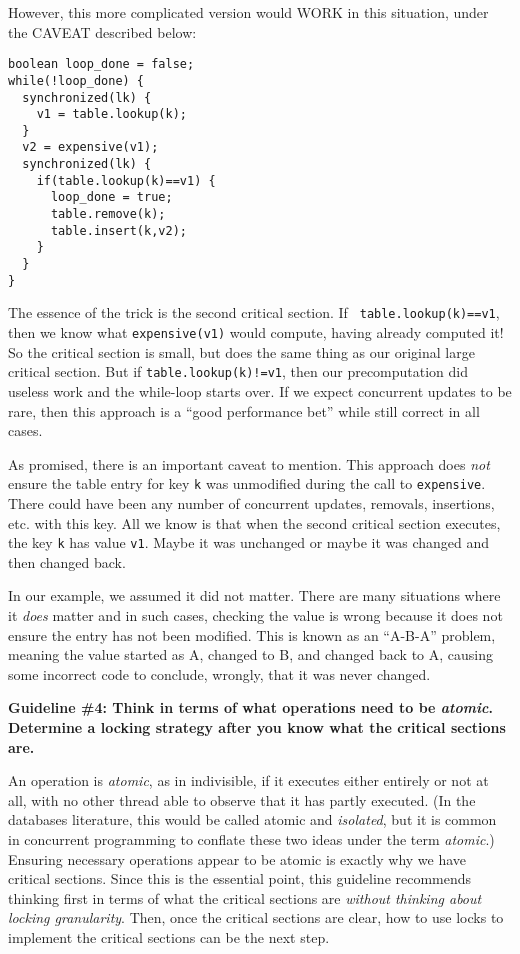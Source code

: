 \documentclass[10pt]{article}
\begin{document}
However, this more complicated version would WORK in this situation,
under the CAVEAT described below:
\begin{verbatim}
boolean loop_done = false;
while(!loop_done) {
  synchronized(lk) {
    v1 = table.lookup(k);
  } 
  v2 = expensive(v1);
  synchronized(lk) {
    if(table.lookup(k)==v1) {
      loop_done = true;
      table.remove(k);
      table.insert(k,v2);
    }
  }
}
\end{verbatim}
The essence of the trick is the second critical section.  If {\tt
  table.lookup(k)==v1}, then we know what {\tt expensive(v1)} would
  compute, having already computed it!  So the critical section is
  small, but does the same thing as our original large critical
  section.  But if {\tt table.lookup(k)!=v1}, then our precomputation
  did useless work and the while-loop starts over.  If we expect
  concurrent updates to be rare, then this approach is a ``good
  performance bet'' while still correct in all cases.
  
  As promised, there is an important caveat to mention.  This approach
  does \emph{not} ensure the table entry for key {\tt k} was
  unmodified during the call to {\tt expensive}.  There could have
  been any number of concurrent updates, removals, insertions, etc.
  with this key.  All we know is that when the second critical section
  executes, the key {\tt k} has value {\tt v1}.  Maybe it was
  unchanged or maybe it was changed and then changed back.

In our example, we assumed it did not matter.  There are many
situations where it \emph{does} matter and in such cases, checking the
value is wrong because it does not ensure the entry has not been
modified.  This is known as an ``A-B-A'' problem, meaning the value
started as A, changed to B, and changed back to A, causing some
incorrect code to conclude, wrongly, that it was never changed.

\medskip
\noindent\textbf{Guideline \#4: Think in terms of what operations need
to be \emph{atomic}.  Determine a locking strategy after you know what
the critical sections are.}
\medskip

An operation is \emph{atomic}, as in indivisible, if it executes
either entirely or not at all, with no other thread able to observe
that it has partly executed.  (In the databases literature, this would
be called atomic and \emph{isolated}, but it is common in concurrent
programming to conflate these two ideas under the term \emph{atomic}.)
Ensuring necessary operations appear to be atomic is exactly why we
have critical sections.  Since this is the essential point, this
guideline recommends thinking first in terms of what the critical
sections are \emph{without thinking about locking granularity}.  Then,
once the critical sections are clear, how to use locks to implement
the critical sections can be the next step.
\end{document}

